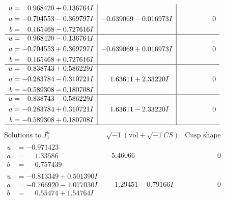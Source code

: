 \documentclass[1p]{elsarticle_modified}
\theoremstyle{definition}
\newcommand{\I}{\sqrt{-1}}
\begin{document}
$$\begin{array}{c|c|c}
\begin{aligned}
u &= \phantom{-}0.968420 + 0.136764 I \\
a &= -0.704553 - 0.369797 I \\
b &= \phantom{-}0.165468 - 0.727616 I\end{aligned}
 & -0.639069 - 0.016973 I & \phantom{-0.000000 } 0 \\ \hline\begin{aligned}
u &= \phantom{-}0.968420 - 0.136764 I \\
a &= -0.704553 + 0.369797 I \\
b &= \phantom{-}0.165468 + 0.727616 I\end{aligned}
 & -0.639069 + 0.016973 I & \phantom{-0.000000 } 0 \\ \hline\begin{aligned}
u &= -0.838743 + 0.586229 I \\
a &= -0.283784 - 0.310721 I \\
b &= -0.589308 - 0.180708 I\end{aligned}
 & \phantom{-}1.63611 + 2.33220 I & \phantom{-0.000000 } 0 \\ \hline\begin{aligned}
u &= -0.838743 - 0.586229 I \\
a &= -0.283784 + 0.310721 I \\
b &= -0.589308 + 0.180708 I\end{aligned}
 & \phantom{-}1.63611 - 2.33220 I & \phantom{-0.000000 } 0\\
 \hline 
 \end{array}$$\newpage$$\begin{array}{c|c|c}  
\text{Solutions to }I^u_{1}& \I (\text{vol} + \sqrt{-1}CS) & \text{Cusp shape}\\
 \hline 
\begin{aligned}
u &= -0.971423\phantom{ +0.000000I} \\
a &= \phantom{-}1.33586\phantom{ +0.000000I} \\
b &= \phantom{-}0.757439\phantom{ +0.000000I}\end{aligned}
 & -5.46066\phantom{ +0.000000I} & \phantom{-0.000000 } 0 \\ \hline\begin{aligned}
u &= -0.813349 + 0.501390 I \\
a &= -0.766920 - 1.077030 I \\
b &= \phantom{-}0.55474 + 1.54764 I\end{aligned}
 & \phantom{-}1.29451 - 0.79166 I & \phantom{-0.000000 } 0 \\ \hline\begin{aligned}

\end{aligned}
\end{array}$$
\end{document}
